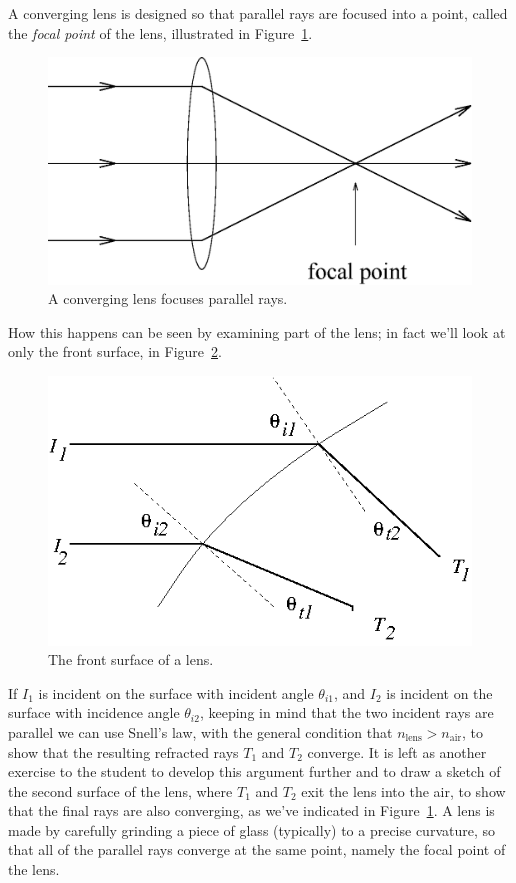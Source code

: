 A converging lens is designed so that parallel rays are focused into a point, 
called the {\it focal point} of the lens, illustrated in 
Figure~\ref{fig:opt:focalpt}.
\begin{figure}[htb]
\centering 
\epsfxsize=8cm \includegraphics[scale=0.6]{9_imaging/focalpt.eps}
\caption{A converging lens focuses parallel rays.}
\label{fig:opt:focalpt}
\end{figure}
How this happens can be seen by examining part of the lens; in fact we'll look
at only the front surface, in Figure~\ref{fig:opt:frontsurf}.
\begin{figure}[htb]
\centering 
\epsfxsize=8cm \includegraphics{9_imaging/frontsurf.eps}
\caption{The front surface of a lens.}
\label{fig:opt:frontsurf}
\end{figure}
If $I_1$ is incident on the surface with incident angle $\theta_{i1}$, and  $I_2$ is incident on the surface with incidence angle $\theta_{i2}$, keeping in mind that the two incident rays are parallel we can use Snell's law, with the general condition that $n_{\mbox{lens}}>n_{\mbox{air}}$, to show that
the resulting refracted rays $T_1$ and $T_2$ converge.  It is left as another exercise to the 
student to develop this argument further and to draw a sketch of the second
surface of the lens, where $T_1$ and $T_2$ exit the lens into the air, to 
show that the final rays are also converging, as we've indicated in 
Figure~\ref{fig:opt:focalpt}. A lens is made by carefully grinding a piece of
glass (typically) to a precise curvature, so that all of the parallel rays
converge at the same point, namely the focal point of the lens.

